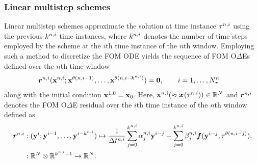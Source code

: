 \subsubsection{Linear multistep schemes}\label{sec:lmm}
Linear multistep schemes approximate the solution at time instance $\tau^{n,i}$ using the previous $k^{n,i}$ time instances, where $k^{n,i}$ denotes the number of time steps employed by the scheme at the $i$th time instance of the $n$th window. 
Employing such a method to discretize the FOM ODE yields the sequence of FOM
O$\Delta$Es defined over the $n$th time window
\begin{align*}
&\boldsymbol r_{}^{n,i} ({\mathbf{x}}^{n,i};{\mathbf{x}}^{\theta(n,i-1)},\ldots,{\mathbf{x}}^{\theta(n,i-k^{n,i})}) = \boldsymbol 0, \qquad i=1,\ldots,N_{\tau}^{n}
\end{align*}
along with the initial condition ${\mathbf{x}}^{1,0} = {{\mathbf{x}}_0}$.
Here, ${\mathbf{x}}^{n,i} (\approx
{\boldsymbol x}^{}(\tau^{n,i}))
\in \mathbb{R}^{N}$ and $\boldsymbol r_{}^{n,i}$ denotes the FOM O$\Delta$E
residual over the $i$th time instance of the $n$th window  
defined as
\begin{align*}
\boldsymbol r_{}^{n,i} &: (\mathbf{y}^{i};\mathbf{y}^{i-1},\ldots,\mathbf{y}^{i-k^{n,i}}) \mapsto  \frac{1}{\Delta t^{n,i}} \sum_{j=0}^{k^{n,i}} \alpha^{n,i}_j \mathbf{y}^{i-j} -  \sum_{j=0}^{k^{n,i}} \beta^{n,i}_j \boldsymbol f(\mathbf{y}^{i-j},\tau^{\theta(n,i-j)}), \\
               &: \mathbb{R}^{N} \otimes \mathbb{R}^{k^{n,i}+1} \rightarrow \mathbb{R}^{N}. 
\end{align*}

